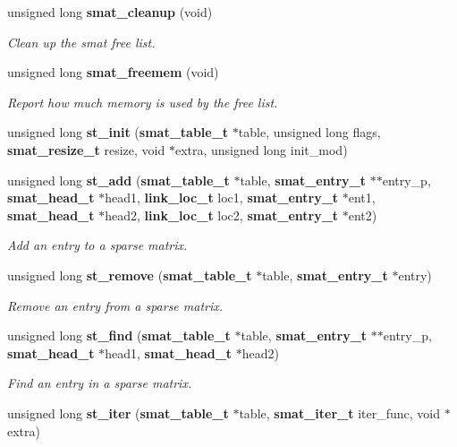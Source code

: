 \begin{CompactItemize}
\item 
unsigned long {\bf smat\_\-cleanup} (void)
\begin{CompactList}\small\item\em Clean up the smat free list.\item\end{CompactList}\item 
unsigned long {\bf smat\_\-freemem} (void)
\begin{CompactList}\small\item\em Report how much memory is used by the free list.\item\end{CompactList}\item 
unsigned long {\bf st\_\-init} ({\bf smat\_\-table\_\-t} $\ast$table, unsigned long flags, {\bf smat\_\-resize\_\-t} resize, void $\ast$extra, unsigned long init\_\-mod)
\item 
unsigned long {\bf st\_\-add} ({\bf smat\_\-table\_\-t} $\ast$table, {\bf smat\_\-entry\_\-t} $\ast$$\ast$entry\_\-p, {\bf smat\_\-head\_\-t} $\ast$head1, {\bf link\_\-loc\_\-t} loc1, {\bf smat\_\-entry\_\-t} $\ast$ent1, {\bf smat\_\-head\_\-t} $\ast$head2, {\bf link\_\-loc\_\-t} loc2, {\bf smat\_\-entry\_\-t} $\ast$ent2)
\begin{CompactList}\small\item\em Add an entry to a sparse matrix.\item\end{CompactList}\item 
unsigned long {\bf st\_\-remove} ({\bf smat\_\-table\_\-t} $\ast$table, {\bf smat\_\-entry\_\-t} $\ast$entry)
\begin{CompactList}\small\item\em Remove an entry from a sparse matrix.\item\end{CompactList}\item 
unsigned long {\bf st\_\-find} ({\bf smat\_\-table\_\-t} $\ast$table, {\bf smat\_\-entry\_\-t} $\ast$$\ast$entry\_\-p, {\bf smat\_\-head\_\-t} $\ast$head1, {\bf smat\_\-head\_\-t} $\ast$head2)
\begin{CompactList}\small\item\em Find an entry in a sparse matrix.\item\end{CompactList}\item 
unsigned long {\bf st\_\-iter} ({\bf smat\_\-table\_\-t} $\ast$table, {\bf smat\_\-iter\_\-t} iter\_\-func, void $\ast$extra)

\end{CompactItemize}
